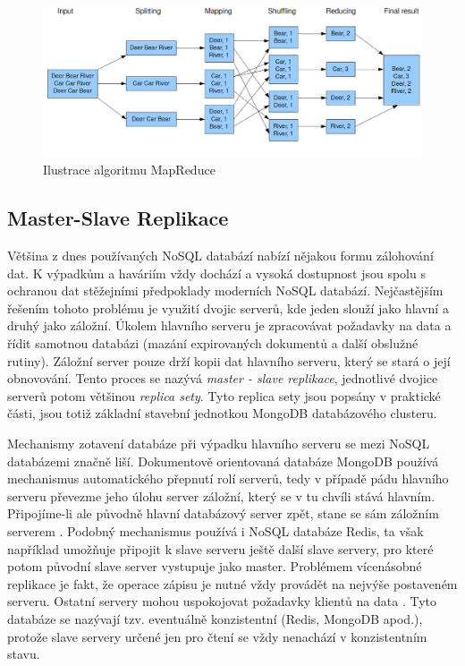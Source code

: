 \begin{figure}[h]
\begin{centering}
\includegraphics[scale=0.3]{obrazky/mapreduce}
\par\end{centering}
\caption{Ilustrace algoritmu MapReduce \cite{nosqlIrena}}
\end{figure} 
\FloatBarrier
\subsection{Master-Slave Replikace}
Většina z dnes používaných NoSQL databází nabízí nějakou formu zálohování dat. K výpadkům a haváriím vždy dochází a vysoká dostupnost jsou spolu s ochranou dat stěžejními předpoklady moderních NoSQL databází. Nejčastějším řešením tohoto problému je využití dvojic serverů, kde jeden slouží jako hlavní a druhý jako záložní. Úkolem hlavního serveru je zpracovávat požadavky na data a řídit samotnou databázi (mazání expirovaných dokumentů a další obslužné rutiny). Záložní server pouze drží kopii dat hlavního serveru, který se stará o její obnovování. Tento proces se nazývá \emph{master - slave replikace}, jednotlivé dvojice serverů potom většinou \emph{replica sety}. Tyto replica sety jsou popsány v praktické části, jsou totiž základní stavební jednotkou MongoDB databázového clusteru. 

Mechanismy zotavení databáze při výpadku hlavního serveru se mezi NoSQL databázemi značně liší. Dokumentově orientovaná databáze MongoDB používá mechanismus automatického přepnutí rolí serverů, tedy v případě pádu hlavního serveru převezme jeho úlohu server záložní, který se v tu chvíli stává hlavním. Připojíme-li ale původně hlavní databázový server zpět, stane se sám záložním serverem \cite{peteraMongo}. Podobný mechanismus používá i NoSQL databáze Redis, ta však například umožňuje připojit k slave serveru ještě další slave servery, pro které potom původní slave server vystupuje jako master. Problémem vícenásobné replikace je fakt, že operace zápisu je nutné vždy provádět na nejvýše postaveném serveru. Ostatní servery mohou uspokojovat požadavky klientů na data \cite{panykoNosql}. Tyto databáze se nazývají tzv. eventuálně konzistentní (Redis, MongoDB apod.), protože slave servery určené jen pro čtení se vždy nenachází v konzistentním stavu.

